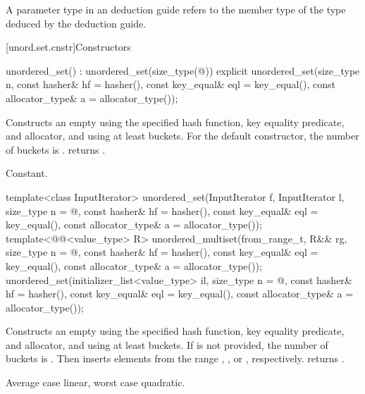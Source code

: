 \pnum
A  parameter type in an  deduction guide
refers to the  member type of
the type deduced by the deduction guide.

[unord.set.cnstr]{Constructors}

%
\begin{itemdecl}
unordered_set() : unordered_set(size_type(@\seebelow@)) { }
explicit unordered_set(size_type n,
                       const hasher& hf = hasher(),
                       const key_equal& eql = key_equal(),
                       const allocator_type& a = allocator_type());
\end{itemdecl}

\begin{itemdescr}
\pnum
\effects
Constructs an empty  using the
specified hash function, key equality predicate, and allocator, and
using at least  buckets.  For the default constructor,
the number of buckets is .
 returns .

\pnum
\complexity
Constant.
\end{itemdescr}

%
\begin{itemdecl}
template<class InputIterator>
  unordered_set(InputIterator f, InputIterator l,
                size_type n = @\seebelow@,
                const hasher& hf = hasher(),
                const key_equal& eql = key_equal(),
                const allocator_type& a = allocator_type());
template<@@<value_type> R>
  unordered_multiset(from_range_t, R&& rg,
                     size_type n = @\seebelow@,
                     const hasher& hf = hasher(),
                     const key_equal& eql = key_equal(),
                     const allocator_type& a = allocator_type());
unordered_set(initializer_list<value_type> il,
              size_type n = @\seebelow@,
              const hasher& hf = hasher(),
              const key_equal& eql = key_equal(),
              const allocator_type& a = allocator_type());
\end{itemdecl}

\begin{itemdescr}
\pnum
\effects
Constructs an empty  using the
specified hash function, key equality predicate, and allocator, and
using at least  buckets. If  is not
provided, the number of buckets is . Then
inserts elements from the range , , or ,
respectively.
 returns .

\pnum
\complexity
Average case linear, worst case quadratic.
\end{itemdescr}

